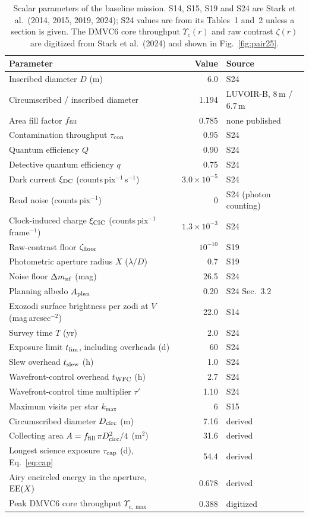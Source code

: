 \documentclass[11pt,a4paper]{article}
\begin{document}
\begin{table}[htbp]
\centering
\scriptsize
\begin{tabular}{p{8.2cm}rp{3.6cm}}
\toprule
\textbf{Parameter} & \textbf{Value} & \textbf{Source} \\
\midrule
Inscribed diameter $D$ (m) & 6.0 & S24 \\
Circumscribed / inscribed diameter & 1.194 & LUVOIR-B, 8\,m / 6.7\,m \\
Area fill factor $f_{\rm fill}$ & 0.785 & none published \\
Contamination throughput $\tau_{\rm con}$ & 0.95 & S24 \\
Quantum efficiency $Q$ & 0.90 & S24 \\
Detective quantum efficiency $q$ & 0.75 & S24 \\
Dark current $\xi_{\rm DC}$ (counts\,pix$^{-1}$\,s$^{-1}$) & $3.0\times10^{-5}$ & S24 \\
Read noise (counts\,pix$^{-1}$) & 0 & S24 (photon counting) \\
Clock-induced charge $\xi_{\rm CIC}$ (counts\,pix$^{-1}$\,frame$^{-1}$) & $1.3\times10^{-3}$ & S24 \\
Raw-contrast floor $\zeta_{\rm floor}$ & $10^{-10}$ & S19 \\
Photometric aperture radius $X$ ($\lambda/D$) & 0.7 & S19 \\
Noise floor $\Delta m_{\rm nf}$ (mag) & 26.5 & S24 \\
Planning albedo $A_{\rm plan}$ & 0.20 & S24 Sec.~3.2 \\
Exozodi surface brightness per zodi at $V$ (mag\,arcsec$^{-2}$) & 22.0 & S14 \\
Survey time $T$ (yr) & 2.0 & S24 \\
Exposure limit $t_{\rm lim}$, including overheads (d) & 60 & S24 \\
Slew overhead $t_{\rm slew}$ (h) & 1.0 & S24 \\
Wavefront-control overhead $t_{\rm WFC}$ (h) & 2.7 & S24 \\
Wavefront-control time multiplier $\tau'$ & 1.10 & S24 \\
Maximum visits per star $k_{\max}$ & 6 & S15 \\
\midrule
Circumscribed diameter $D_{\rm circ}$ (m) & 7.16 & derived \\
Collecting area $A = f_{\rm fill}\,\pi D_{\rm circ}^2/4$ (m$^2$) & 31.6 & derived \\
Longest science exposure $\tau_{\rm cap}$ (d), Eq.~\eqref{eq:cap} & 54.4 & derived \\
Airy encircled energy in the aperture, ${\rm EE}(X)$ & 0.678 & derived \\
Peak DMVC6 core throughput $\Upsilon_{c,\max}$ & 0.388 & digitized \\
\bottomrule
\end{tabular}
\caption{Scalar parameters of the baseline mission. S14, S15, S19 and S24 are Stark et al.\
(2014, 2015, 2019, 2024); S24 values are from its Tables~1 and~2 unless a section is given. The
DMVC6 core throughput $\Upsilon_c(r)$ and raw contrast $\zeta(r)$ are digitized from Stark et al.\
(2024) and shown in Fig.~\ref{fig:pair25}.}
\label{tab:params}
\end{table}
\end{document}
